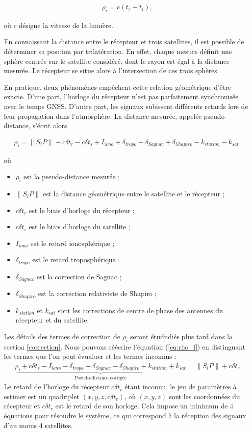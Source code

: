 \begin{align}
\rho_i = c(t_r-t_i),
\end{align}

où $c$ désigne la vitesse de la lumière.

En connaissant la distance entre le récepteur et trois satellites, il est possible de déterminer sa position par trilatération.
En effet, chaque mesure définit une sphère centrée sur le satellite considéré, dont le rayon est égal à la distance mesurée.
Le récepteur se situe alors à l'intersection de ces trois sphères.

En pratique, deux phénomènes empêchent cette relation géométrique d'être exacte.
D'une part, l'horloge du récepteur n'est pas parfaitement synchronisée avec le temps GNSS.
D'autre part, les signaux subissent différents retards lors de leur propagation dans l'atmosphère.
La distance mesurée, appelée pseudo-distance, s'écrit alors

\begin{align}
\rho_i
=
\|S_iP\|
+
c\delta t_r
-
c\delta t_s
+
I_{iono}
+
\delta_{tropo}
+
\delta_{Sagnac}
+
\delta_{Shapiro}
-
k_{station}
-
k_{sat}.
\label{eq:rho_i}
\end{align}

où

\begin{itemize}
\item $\rho_i$ est la pseudo-distance mesurée ;
\item $\|S_iP\|$ est la distance géométrique entre le satellite et le récepteur ;
\item $c\delta t_r$ est le biais d'horloge du récepteur ;
\item $c\delta t_s$ est le biais d'horloge du satellite ;
\item $I_{iono}$ est le retard ionosphérique ;
\item $\delta_{tropo}$ est le retard troposphérique ;
\item $\delta_{Sagnac}$ est la correction de Sagnac ;
\item $\delta_{Shapiro}$ est la correction relativiste de Shapiro ;
\item $k_{station}$ et $k_{sat}$ sont les corrections de centre de phase des antennes du récepteur et du satellite.
\end{itemize}

Les détails des termes de correction de $\rho_i$ seront étududiés plus tard dans la section \ref{correction}. Nous pouvons réécrire l'équation (\ref{eq:rho_i}) en distinguant les termes que l'on peut évualuer et les termes inconnus : \begin{align} \underbrace{\rho_i + c\delta t_s - I_{iono} - \delta_{tropo} - \delta_{Sagnac} - \delta_{Shapiro} + k_{station} + k_{sat}}_{\text{Pseudo-distance corrigée}} = \| S_i P \| + c\delta t_r \label{eq:termes_eval} \end{align} Le retard de l'horloge du récepteur $c\delta t_r$ étant inconnu, le jeu de paramètres à estimer est un quadriplet $(x, y, z, c\delta t_r)$, où $(x, y, z)$ sont les coordonnées du récepteur et $c\delta t_r$ est le retard de son horloge. Cela impose un minimum de 4 équations pour résoudre le système, ce qui correspond à la réception des signaux d'au moins 4 satellites.


